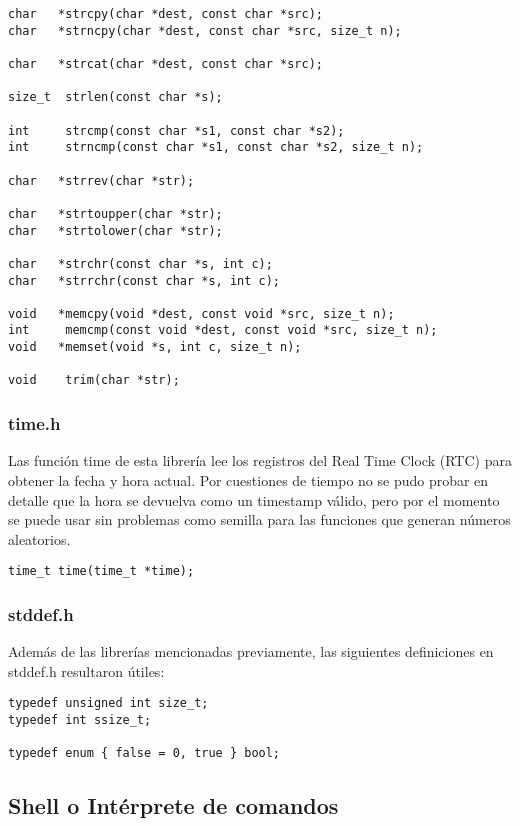 \documentclass[11pt]{article}
\begin{document}
\begin{lstlisting}
char   *strcpy(char *dest, const char *src);
char   *strncpy(char *dest, const char *src, size_t n);

char   *strcat(char *dest, const char *src);

size_t  strlen(const char *s);

int     strcmp(const char *s1, const char *s2);
int     strncmp(const char *s1, const char *s2, size_t n);

char   *strrev(char *str);

char   *strtoupper(char *str);
char   *strtolower(char *str);

char   *strchr(const char *s, int c);
char   *strrchr(const char *s, int c);

void   *memcpy(void *dest, const void *src, size_t n);
int     memcmp(const void *dest, const void *src, size_t n);
void   *memset(void *s, int c, size_t n);

void    trim(char *str);
\end{lstlisting}

\subsubsection{time.h}

Las función time de esta librería lee los registros del Real Time Clock (RTC) para obtener la fecha y hora actual. Por cuestiones de tiempo no se pudo probar en detalle que la hora se devuelva como un timestamp válido, pero por el momento se puede usar sin problemas como semilla para las funciones que generan números aleatorios.

\begin{lstlisting}
time_t time(time_t *time);
\end{lstlisting}

\subsubsection{stddef.h}

Además de las librerías mencionadas previamente, las siguientes definiciones en stddef.h resultaron útiles:

\begin{lstlisting}
typedef unsigned int size_t;
typedef int ssize_t;

typedef enum { false = 0, true } bool;
\end{lstlisting}

\subsection{Shell o Intérprete de comandos}
\end{document}
